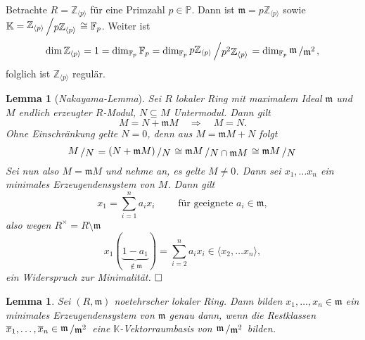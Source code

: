 \documentclass[11pt]{book}
\newtheorem{lemma}[theorem]{Lemma}
\theoremstyle{nonumberbreak}
\newenvironment{pr}[1][]{\ifthenelse{\equal{#1}{}}{\proof}{\proof[#1]}\rm}{\endproof}
\newenvironment{ex}[1][]{\ifthenelse{\equal{#1}{}}{\example}{\example[#1]}\rm}{\endexample}
\newcommand{\slant}[2]{{\raisebox{.1em}{$#1$}\left/\raisebox{-.1em}{$#2$}\right.}}
\begin{document}
\begin{spacing}{1.3}
\begin{ex}

 Betrachte $R= \mathbb{Z}_{\langle p \rangle}$ für eine Primzahl $p \in \mathbb{P}$. Dann ist $\mathfrak{m}= p \mathbb{Z}_{\langle p \rangle}$ sowie $\mathbb{K}= \slant{\mathbb{Z}_{\langle p \rangle}}{p \mathbb{Z}_{\langle p \rangle}} \cong \mathbb{F}_p$. Weiter ist
 $$ \dim \mathbb{Z}_{\langle p \rangle} = 1 = \dim_{\mathbb{F}_p} \mathbb{F}_p = \dim_{\mathbb{F}_p} \slant{p \mathbb{Z}_{\langle p \rangle}}{p^2 \mathbb{Z}_{\langle p \rangle}} = \dim_{\mathbb{F}_p} \slant{\mathfrak{m}}{\mathfrak{m}^2},$$
 folglich ist $\mathbb{Z}_{\langle p \rangle }$ regulär.
 \end{ex}
 
 
\begin{lemma}[\rm \it Nakayama-Lemma]

Sei $R$ lokaler Ring mit maximalem Ideal $\mathfrak{m}$ und $M$ endlich erzeugter $R$-Modul, $N \subseteq M$ Untermodul. Dann gilt
$$ M = N+ \mathfrak{m} M \quad \Longrightarrow \quad M=N.$$
\begin{pr}
Ohne Einschränkung gelte $N=0$, denn aus $M= \mathfrak{m} M + N$ folgt 
$$\slant{M}{N} = \slant{(N+ \mathfrak{m}M)}{N} \cong \slant{\mathfrak{m} M}{N \cap \mathfrak{m}M} \cong \slant{\mathfrak{m}M }{N}$$
Sei nun also $M = \mathfrak{m}M$ und nehme an, es gelte $M \neq 0$. Dann sei $x_1,\ldots x_n$ ein minimales Erzeugendensystem von $M$. Dann gilt
$$x_1 = \sum_{i=1}^n a_i x_i \qquad \textrm{ für geeignete } a_i \in \mathfrak{m},$$
also wegen $R^{\times} = R \setminus \mathfrak{m}$ 
$$x_1( \underbrace{ 1- a_1}_{ \notin \mathfrak{m}}) = \sum_{i=2}^n a_i x_i \in \langle x_2, \ldots x_n \rangle,$$
ein Widerspruch zur Minimalität. $\hfill \Box$
\end{pr}
\end{lemma}

\begin{lemma} %

Sei $(R, \mathfrak{m})$ noetehrscher lokaler Ring. Dann bilden $x_1, \ldots, x_n \in \mathfrak{m}$ ein minimales Erzeugendensystem von $\mathfrak{m}$ genau dann, wenn die Restklassen $\overline{x}_1, \ldots, \overline{x}_n \in \slant{\mathfrak{m}}{\mathfrak{m}^2}$ eine $\mathbb{K}$-Vektorraumbasis von $\slant{\mathfrak{m}}{\mathfrak{m}^2}$ bilden.


\end{lemma}
\end{spacing}
\end{document}
